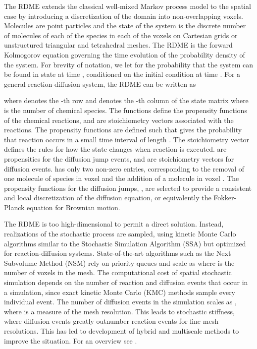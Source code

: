 \documentclass[final,leqno,onefignum,onetabnum]{siamltex1213}
\begin{document}
The RDME extends the classical well-mixed Markov process model \cite{SSA} to the spatial case by introducing a discretization of the domain into  non-overlapping voxels. Molecules are point particles and the state of the system is the discrete number of molecules of each of the species in each of the voxels on Cartesian grids or unstructured triangular and tetrahedral meshes. 
The RDME is the forward Kolmogorov equation governing the time evolution of the probability density of the system.  
For brevity of notation, we let  for the probability that the system can be found in state  at time , conditioned on the initial condition  at time . For a general reaction-diffusion system, the RDME can be written as

\noindent
where  denotes the -th row and  denotes the -th column of the  state matrix  where  is the number of chemical species. The functions  define the propensity functions of the  chemical reactions, and  are stoichiometry vectors associated with the reactions. The propensity functions are defined such that   gives the probability that reaction  occurs in a small time interval of length . The stoichiometry vector   defines the rules for how the state changes when reaction  is executed.  are propensities for the diffusion jump events, and  are stoichiometry vectors for diffusion events. 
 has only two non-zero entries, corresponding to the removal of one molecule of species  in voxel  and the addition of a molecule in voxel .  The propensity functions for the diffusion jumps, , are selected to provide a consistent and local discretization of the diffusion equation, or equivalently the Fokker-Planck equation for Brownian motion. 

The RDME is too high-dimensional to permit a direct solution. Instead, realizations of the stochastic process are sampled, using kinetic Monte Carlo algorithms similar to the Stochastic Simulation Algorithm (SSA)\cite{SSA} but optimized for reaction-diffusion systems. State-of-the-art algorithms such as the Next Subvolume Method (NSM)\cite{NSM} rely on priority queues and scale as  where  is the number of voxels in the mesh. The computational cost of spatial stochastic simulation depends on the number of reaction and diffusion events that occur in a simulation, since exact kinetic Monte Carlo (KMC) methods sample every individual event. The number of diffusion events in the simulation scales as , where  is a measure of the mesh resolution. This leads to stochastic stiffness, where diffusion events greatly outnumber reaction events for fine mesh resolutions. This has led to development of hybrid and multiscale methods to improve the situation. For an overview see \cite{GillHellPetz}. 
\end{document}

